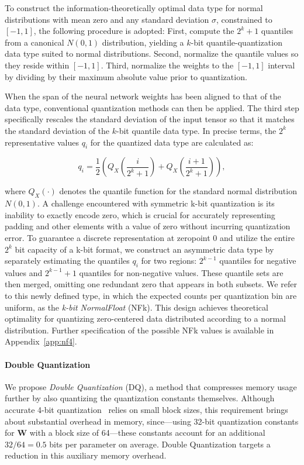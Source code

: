 To construct the information-theoretically optimal data type for normal distributions with mean zero and any standard deviation $\sigma$, constrained to $[-1, 1]$, the following procedure is adopted: First, compute the $2^k+1$ quantiles from a canonical $N(0, 1)$ distribution, yielding a $k$-bit quantile-quantization data type suited to normal distributions. Second, normalize the quantile values so they reside within $[-1, 1]$. Third, normalize the weights to the $[-1, 1]$ interval by dividing by their maximum absolute value prior to quantization.

When the span of the neural network weights has been aligned to that of the data type, conventional quantization methods can then be applied. The third step specifically rescales the standard deviation of the input tensor so that it matches the standard deviation of the $k$-bit quantile data type. In precise terms, the $2^k$ representative values $q_i$ for the quantized data type are calculated as:

\begin{equation}
q_i  = \frac{1}{2}\left( Q_X\left(\frac{i}{2^k+1}\right) + Q_X\left(\frac{i+1}{2^k+1}\right)\right),
\end{equation}

where $Q_X(\cdot)$ denotes the quantile function for the standard normal distribution $N(0,1)$. A challenge encountered with symmetric k-bit quantization is its inability to exactly encode zero, which is crucial for accurately representing padding and other elements with a value of zero without incurring quantization error. To guarantee a discrete representation at zeropoint $0$ and utilize the entire $2^k$ bit capacity of a k-bit format, we construct an asymmetric data type by separately estimating the quantiles $q_i$ for two regions: $2^{k-1}$ quantiles for negative values and $2^{k-1}+1$ quantiles for non-negative values. These quantile sets are then merged, omitting one redundant zero that appears in both subsets. We refer to this newly defined type, in which the expected counts per quantization bin are uniform, as the \emph{k-bit NormalFloat} (NFk). This design achieves theoretical optimality for quantizing zero-centered data distributed according to a normal distribution. Further specification of the possible NFk values is available in Appendix~\ref{app:nf4}.

\paragraph{Double Quantization{}}
We propose \emph{Double Quantization} (DQ), a method that compresses memory usage further by also quantizing the quantization constants themselves. Although accurate 4-bit quantization~\citep{dettmers2022case} relies on small block sizes, this requirement brings about substantial overhead in memory, since—using 32-bit quantization constants for $\mathbf{W}$ with a block size of 64—these constants account for an additional $32/64 = 0.5$ bits per parameter on average. Double Quantization targets a reduction in this auxiliary memory overhead.

